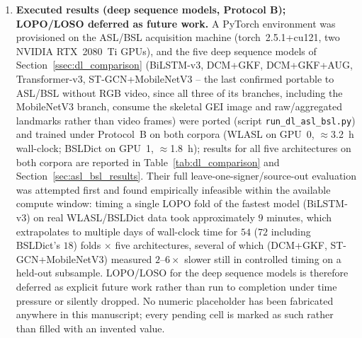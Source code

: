 \documentclass[journal]{IEEEtran}
\begin{document}
\begin{enumerate}
\item \textbf{Executed results (deep sequence models, Protocol B); LOPO/LOSO deferred as future work.} A PyTorch environment was provisioned on the ASL/BSL acquisition machine (torch~2.5.1+cu121, two NVIDIA RTX~2080~Ti GPUs), and the five deep sequence models of Section~\ref{ssec:dl_comparison} (BiLSTM-v3, DCM+GKF, DCM+GKF+AUG, Transformer-v3, ST-GCN+MobileNetV3 -- the last confirmed portable to ASL/BSL without RGB video, since all three of its branches, including the MobileNetV3 branch, consume the skeletal GEI image and raw/aggregated landmarks rather than video frames) were ported (script \texttt{run\_dl\_asl\_bsl.py}) and trained under Protocol~B on both corpora (WLASL on GPU~0, $\approx$3.2~h wall-clock; BSLDict on GPU~1, $\approx$1.8~h); results for all five architectures on both corpora are reported in Table~\ref{tab:dl_comparison} and Section~\ref{sec:asl_bsl_results}. Their full leave-one-signer/source-out evaluation was attempted first and found empirically infeasible within the available compute window: timing a single LOPO fold of the fastest model (BiLSTM-v3) on real WLASL/BSLDict data took approximately $9$ minutes, which extrapolates to multiple days of wall-clock time for $54$ ($72$ including BSLDict's $18$) folds $\times$ five architectures, several of which (DCM+GKF, ST-GCN+MobileNetV3) measured $2$--$6\times$ slower still in controlled timing on a held-out subsample. LOPO/LOSO for the deep sequence models is therefore deferred as explicit future work rather than run to completion under time pressure or silently dropped. No numeric placeholder has been fabricated anywhere in this manuscript; every pending cell is marked as such rather than filled with an invented value.

\end{enumerate}
\end{document}

